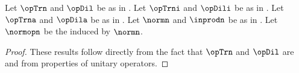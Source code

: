 \begin{proposition}
\label{prop:wavstrct_TD_unitary_1}
Let $\opTrn$ and $\opDil$ be as in .
Let $\opTrni$ and $\opDili$ be as in .
Let $\opTrna$ and $\opDila$ be as in .
Let $\normn$ and $\inprodn$ be as in .
Let $\normopn$ be the  induced by $\normn$.
\end{proposition}
\begin{proof}
  These results follow directly from the fact that $\opTrn$ and $\opDil$ are 
   and from
                         {properties of unitary operators.}
\end{proof}

